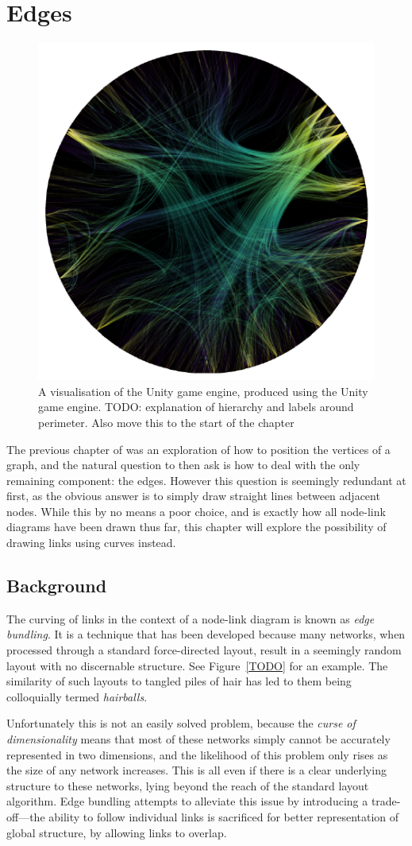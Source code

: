 \chapter{Edges}
\begin{figure}
    \centering
    \includegraphics[width=.6\textwidth]{power/figures/metaunityplaceholder.png}
    \caption{A visualisation of the Unity game engine, produced using the Unity game engine. TODO: explanation of hierarchy and labels around perimeter. Also move this to the start of the chapter}
    \label{fig:metaunity}
\end{figure}
The previous chapter of was an exploration of how to position the vertices of a graph, and the natural question to then ask is how to deal with the only remaining component: the edges. However this question is seemingly redundant at first, as the obvious answer is to simply draw straight lines between adjacent nodes. While this by no means a poor choice, and is exactly how all node-link diagrams have been drawn thus far, this chapter will explore the possibility of drawing links using curves instead.

\section{Background}
The curving of links in the context of a node-link diagram is known as \textit{edge bundling}. It is a technique that has been developed because many networks, when processed through a standard force-directed layout, result in a seemingly random layout with no discernable structure. See Figure~\ref{TODO} for an example. The similarity of such layouts to tangled piles of hair has led to them being colloquially termed \textit{hairballs}.

Unfortunately this is not an easily solved problem, because the \textit{curse of dimensionality} \cite{Friedman2001} means that most of these networks simply cannot be accurately represented in two dimensions, and the likelihood of this problem only rises as the size of any network increases. This is all even if there is a clear underlying structure to these networks, lying beyond the reach of the standard layout algorithm.
Edge bundling attempts to alleviate this issue by introducing a trade-off---the ability to follow individual links is sacrificed for better representation of global structure, by allowing links to overlap.

